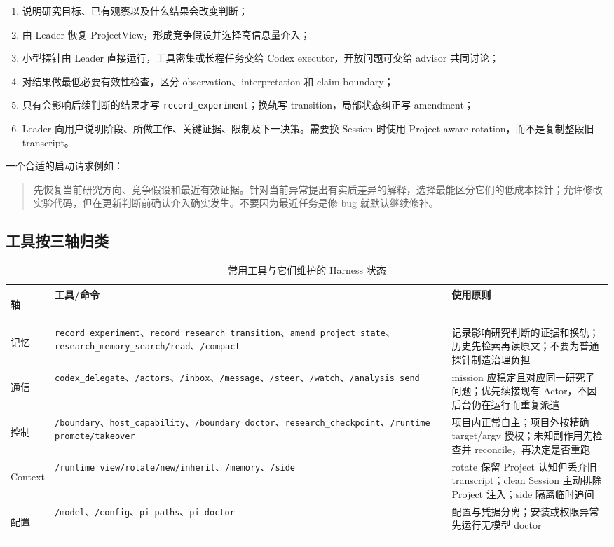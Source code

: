 \documentclass[UTF8,11pt,a4paper,fontset=fandol]{ctexart}
\newcommand{\code}[1]{\texttt{#1}}
\begin{document}
\begin{enumerate}
  \item 说明研究目标、已有观察以及什么结果会改变判断；
  \item 由 Leader 恢复 ProjectView，形成竞争假设并选择高信息量介入；
  \item 小型探针由 Leader 直接运行，工具密集或长程任务交给 Codex executor，开放问题可交给 advisor 共同讨论；
  \item 对结果做最低必要有效性检查，区分 observation、interpretation 和 claim boundary；
  \item 只有会影响后续判断的结果才写 \code{record\_experiment}；换轨写 transition，局部状态纠正写 amendment；
  \item Leader 向用户说明阶段、所做工作、关键证据、限制及下一决策。需要换 Session 时使用 Project-aware rotation，而不是复制整段旧 transcript。
\end{enumerate}

一个合适的启动请求例如：

\begin{quote}
先恢复当前研究方向、竞争假设和最近有效证据。针对当前异常提出有实质差异的解释，选择最能区分它们的低成本探针；允许修改实验代码，但在更新判断前确认介入确实发生。不要因为最近任务是修 bug 就默认继续修补。
\end{quote}

\subsection{工具按三轴归类}

\begin{table}[H]
  \centering
  \caption{常用工具与它们维护的 Harness 状态}
  \small
  \setlength{\tabcolsep}{4pt}
  \begin{tabularx}{\textwidth}{>{\bfseries\raggedright\arraybackslash}p{1.55cm}p{5.25cm}Y}
    \toprule
    轴 & 工具/命令 & 使用原则 \\
    \midrule
    记忆 & \code{record\_experiment}、\code{record\_research\_transition}、\code{amend\_project\_state}、\code{research\_memory\_search/read}、\code{/compact} & 记录影响研究判断的证据和换轨；历史先检索再读原文；不要为普通探针制造治理负担 \\
    通信 & \code{codex\_delegate}、\code{/actors}、\code{/inbox}、\code{/message}、\code{/steer}、\code{/watch}、\code{/analysis send} & mission 应稳定且对应同一研究子问题；优先续接现有 Actor，不因后台仍在运行而重复派遣 \\
    控制 & \code{/boundary}、\code{host\_capability}、\code{/boundary doctor}、\code{research\_checkpoint}、\code{/runtime promote/takeover} & 项目内正常自主；项目外按精确 target/argv 授权；未知副作用先检查并 reconcile，再决定是否重跑 \\
    Context & \code{/runtime view/rotate/new/inherit}、\code{/memory}、\code{/side} & rotate 保留 Project 认知但丢弃旧 transcript；clean Session 主动排除 Project 注入；side 隔离临时追问 \\
    配置 & \code{/model}、\code{/config}、\code{pi paths}、\code{pi doctor} & 配置与凭据分离；安装或权限异常先运行无模型 doctor \\
    \bottomrule
  \end{tabularx}
\end{table}
\end{document}
